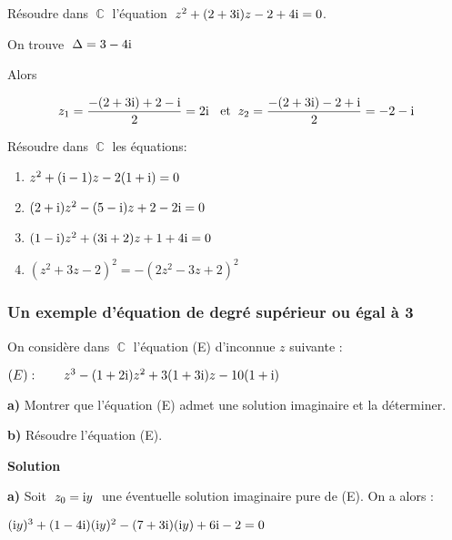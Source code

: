  
\begin{example}
  Résoudre dans $  \;\mathbb{C}  \;$  l'équation  $ \; z^2+(2+3\text{i})z-2+4\text{i}=0 $.
  
  \medskip
  
On trouve    $ \; \Delta =3-4\text{i} $
  
  \medskip


Alors 
  
  $$  z_1=\dfrac{-(2+3\text{i})+ 2-\text{i}}{2}=2\text{i} \;\; \text{ et} \;\; z_2=\dfrac{-(2+3\text{i})-2+\text{i}}{2} =-2-\text{i}$$ 

\end{example}

\begin{exercice}
  Résoudre dans  $ \;\mathbb{C}\; $  les équations:
 
\begin{enumerate}
\item  $ z^2+(\text{i}-1)z-2(1+\text{i})=0 $
\item  $ (2+\text{i})z^2-(5-\text{i})z+2-2\text{i}=0 $
\item  $ (1-\text{i})z^2+(3\text{i}+2)z+1+4\text{i}=0 $
\item  $(z^2 +3z-2)^2 =-(2z^2 -3z+2)^2$
\end{enumerate}
\end{exercice}


\subsubsection*{Un exemple  d'équation de degré supérieur ou égal à 3}

\medskip
 On considère dans  $ \;\mathbb{C} \;$  l'équation (E) d'inconnue $ z $ suivante :
 
 \medskip
 
 $ (E) :\qquad  z^3 - ( 1+2\text{i} )z^2 +3( 1+ 3\text{i} ) z-10(1+ \text{i})$
 
 \medskip
 
 \textbf{a)}\; Montrer que l'équation (E) admet une solution imaginaire et la déterminer.
 
 \textbf{b)}\; Résoudre l'équation (E).
 
 \textbf{Solution}
 
 \medskip
 
  \textbf{a)}\; Soit   $\; z_0 = \text{i} y  \;$ une éventuelle solution imaginaire  pure de (E). On a alors :
  
  \medskip
  
  $ ( \text{i} y )^3 + ( 1-4\text{i} ) ( \text{i} y )^2 -( 7+ 3\text{i} ) ( \text{i} y ) +6\text{i}-2=0 $
  
  \medskip
  
